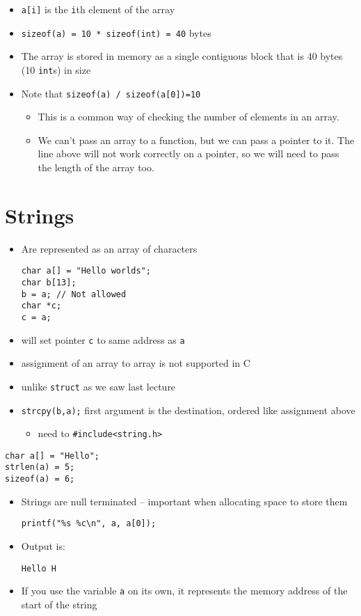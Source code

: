 \documentclass{article}
\begin{document}
\begin{itemize}
\item \verb!a[i]! is the \verb!i!th element of the array
\item \verb!sizeof(a) = 10 * sizeof(int) = 40! bytes
\item The array is stored in memory as a single contiguous block that is 40 bytes (10 \verb!int!s) in size

\item Note that \verb!sizeof(a) / sizeof(a[0])=10!
\begin{itemize}
\item This is a common way of checking the number of elements in an array.
\item We can't pass an array to a function, but we can pass a pointer to it. The line above will not work correctly on a pointer, so we will need to pass the length of the array too.
\end{itemize}
\end{itemize}



\section{Strings}
\begin{itemize}
\item Are represented as an array of characters
\begin{verbatim}
char a[] = "Hello worlds";
char b[13];
b = a; // Not allowed
char *c;
c = a;
\end{verbatim}
\item will set pointer \verb!c! to same address as \verb!a!
\item assignment of an array to array is not supported in C
\item unlike \verb!struct! as we saw last lecture
\item \verb!strcpy(b,a);!  first argument is the destination, ordered like assignment above
\begin{itemize}
\item need to \verb!#include<string.h>!
\end{itemize}
\end{itemize}
\begin{verbatim}
char a[] = "Hello";
strlen(a) = 5;
sizeof(a) = 6;
\end{verbatim}

\begin{itemize}
\item Strings are null terminated -- important when allocating space to store them
\begin{verbatim}
printf("%s %c\n", a, a[0]);
\end{verbatim}
\item Output is:
\begin{verbatim}
Hello H
\end{verbatim}

\item If you use the variable \verb!a! on its own, it represents the memory address of the start of the string
\end{itemize}
\end{document}
